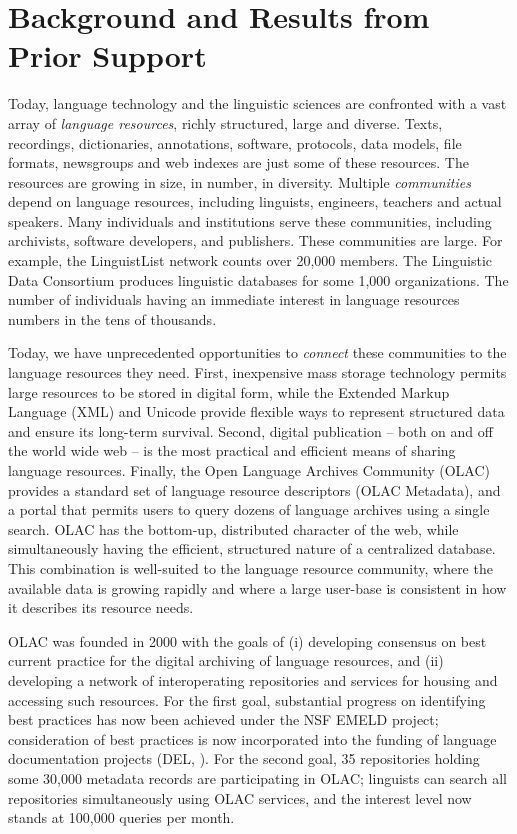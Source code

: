 \section{Background and Results from Prior Support}


Today, language technology and the linguistic sciences are confronted
with a vast array of \emph{language resources}, richly structured,
large and diverse.  Texts, recordings, dictionaries, annotations,
software, protocols, data models, file formats, newsgroups and web
indexes are just some of these resources.  The resources are growing
in size, in number, in diversity.  Multiple \emph{communities} depend
on language resources, including linguists, engineers, teachers and
actual speakers.  Many individuals and institutions serve these
communities, including archivists, software developers, and
publishers.  These communities are large.  For example, the
LinguistList network counts over 20,000 members.  The Linguistic Data
Consortium produces linguistic databases for some 1,000 organizations.
The number of individuals having an immediate interest in language
resources numbers in the tens of thousands.


Today, we have unprecedented opportunities to \emph{connect} these
communities to the language resources they need.  First, inexpensive
mass storage technology permits large resources to be stored in
digital form, while the Extended Markup Language (XML) and Unicode
provide flexible ways to represent structured data and ensure its
long-term survival.  Second, digital publication -- both on and off
the world wide web -- is the most practical and efficient means of
sharing language resources.  Finally, the Open Language Archives
Community (OLAC) provides a standard set of language resource
descriptors (OLAC Metadata), and a portal that permits users to query
dozens of language archives using a single search.  OLAC has the
bottom-up, distributed character of the web, while simultaneously
having the efficient, structured nature of a centralized database.
This combination is well-suited to the language resource community,
where the available data is growing rapidly and where a large
user-base is consistent in how it describes its resource needs.


OLAC was founded in 2000 with the goals of (i) developing consensus on
best current practice for the digital archiving of language resources,
and (ii) developing a network of interoperating repositories and
services for housing and accessing such resources.  For the first
goal, substantial progress on identifying best practices has now been
achieved under the NSF EMELD project; consideration of best practices
is now incorporated into the funding of language documentation
projects (DEL, \citet{BirdSimons03language}).  For the second goal,
35 repositories holding some 30,000 metadata records are
participating in OLAC; linguists can search all repositories
simultaneously using OLAC services, and the interest level now stands
at 100,000 queries per month.

